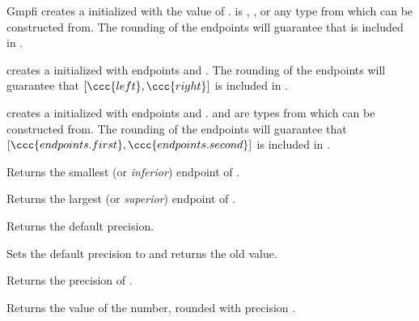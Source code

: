 \begin{ccRefClass} {Gmpfi}
        {creates a  initialized with the value of .
         is , , or any type from which
         can be constructed from. The rounding of the
        endpoints will guarantee that  is included in \ccVar.}

        {creates a  initialized with endpoints 
        and . The rounding of the endpoints will guarantee
        that \([\ccc{left},\ccc{right}]\) is included in \ccVar .}

        {creates a  initialized with endpoints
         and .  and
         are types from which  can be constructed
        from. The rounding of the endpoints will guarantee that
        \([\ccc{endpoints.first},\ccc{endpoints.second}]\) is included in
        \ccVar .}

\ccOperations

        {Returns the smallest (or \emph{inferior})  endpoint of
        .}

        {Returns the largest (or \emph{superior})  endpoint of
        .}


        {Returns the default precision.}

        {Sets the default precision to  and returns the
        old value.}

        {Returns the precision of \ccVar.}

        {Returns the value of the number, rounded with precision .}




\end{ccRefClass}
